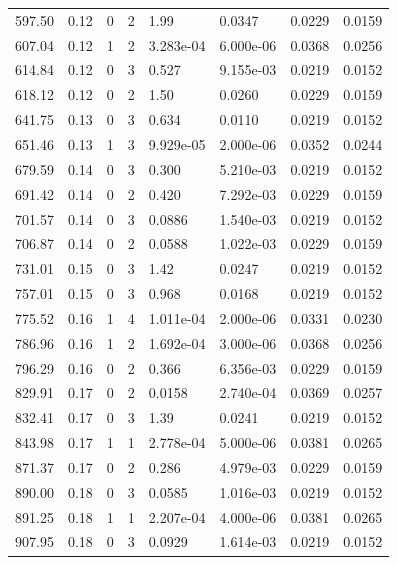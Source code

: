 \documentclass[preview]{standalone}
\begin{document}
{{{\begin{tabular}{L{1.2cm}C{1.2cm} C{0.3cm}C{0.5cm} C{1.4cm}C{1.4cm} C{1.4cm}C{1.4cm}}
  597.50  &  0.12  & 0     &  2 &  1.99  & 0.0347  & 0.0229 &  0.0159   \\ 
  607.04  &  0.12  & 1     &  2 &  3.283e-04  & 6.000e-06  & 0.0368 &  0.0256   \\ 
  614.84  &  0.12  & 0     &  3 &  0.527  & 9.155e-03  & 0.0219 &  0.0152   \\ 
  618.12  &  0.12  & 0     &  2 &  1.50  & 0.0260  & 0.0229 &  0.0159   \\ 
  641.75  &  0.13  & 0     &  3 &  0.634  & 0.0110  & 0.0219 &  0.0152   \\ 
  651.46  &  0.13  & 1     &  3 &  9.929e-05  & 2.000e-06  & 0.0352 &  0.0244   \\ 
  679.59  &  0.14  & 0     &  3 &  0.300  & 5.210e-03  & 0.0219 &  0.0152   \\ 
  691.42  &  0.14  & 0     &  2 &  0.420  & 7.292e-03  & 0.0229 &  0.0159   \\ 
  701.57  &  0.14  & 0     &  3 &  0.0886  & 1.540e-03  & 0.0219 &  0.0152   \\ 
  706.87  &  0.14  & 0     &  2 &  0.0588  & 1.022e-03  & 0.0229 &  0.0159   \\ 
  731.01  &  0.15  & 0     &  3 &  1.42  & 0.0247  & 0.0219 &  0.0152   \\ 
  757.01  &  0.15  & 0     &  3 &  0.968  & 0.0168  & 0.0219 &  0.0152   \\ 
  775.52  &  0.16  & 1     &  4 &  1.011e-04  & 2.000e-06  & 0.0331 &  0.0230   \\ 
  786.96  &  0.16  & 1     &  2 &  1.692e-04  & 3.000e-06  & 0.0368 &  0.0256   \\ 
  796.29  &  0.16  & 0     &  2 &  0.366  & 6.356e-03  & 0.0229 &  0.0159   \\ 
  829.91  &  0.17  & 0     &  2 &  0.0158  & 2.740e-04  & 0.0369 &  0.0257   \\ 
  832.41  &  0.17  & 0     &  3 &  1.39  & 0.0241  & 0.0219 &  0.0152   \\ 
  843.98  &  0.17  & 1     &  1 &  2.778e-04  & 5.000e-06  & 0.0381 &  0.0265   \\ 
  871.37  &  0.17  & 0     &  2 &  0.286  & 4.979e-03  & 0.0229 &  0.0159   \\ 
  890.00  &  0.18  & 0     &  3 &  0.0585  & 1.016e-03  & 0.0219 &  0.0152   \\ 
  891.25  &  0.18  & 1     &  1 &  2.207e-04  & 4.000e-06  & 0.0381 &  0.0265   \\ 
  907.95  &  0.18  & 0     &  3 &  0.0929  & 1.614e-03  & 0.0219 &  0.0152   \\ 

\end{tabular}}}}
\end{document}
